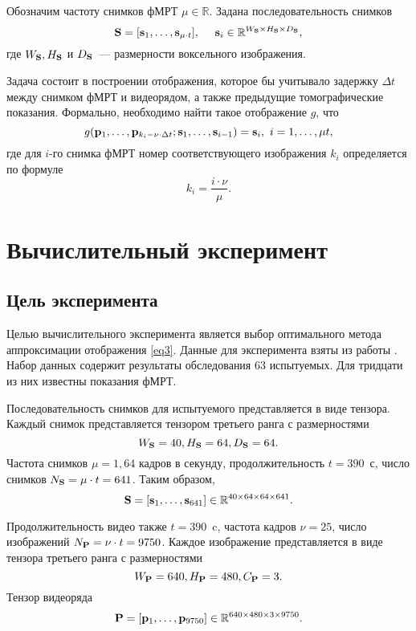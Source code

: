 \documentclass[a4paper, 12pt]{article}
\begin{document}
	Обозначим частоту снимков фМРТ $\mu \in \mathbb{R}$. Задана последовательность снимков 
	\begin{equation}
		\label{eq2}
		\mathbf{S} = [\mathbf{s}_1, \ldots, \mathbf{s}_{\mu \cdot t}], \quad\
		\mathbf{s}_i \in \mathbb{R}^{W_{\mathbf{S}} \times H_{\mathbf{S}} \times D_{\mathbf{S}}},
	\end{equation}
	где $W_{\mathbf{S}}, H_{\mathbf{S}}$ и $D_{\mathbf{S}}$~--- размерности воксельного изображения. 

	Задача состоит в построении отображения, которое бы учитывало задержку $\Delta t$ между
	снимком фМРТ и видеорядом, а также предыдущие томографические показания. Формально, необходимо
	найти такое отображение $g$, что
	\begin{equation}
		\label{eq3}
		g(\mathbf{p}_1, \ldots, \mathbf{p}_{k_i - \nu \cdot \Delta t}; \mathbf{s}_1, \ldots, \mathbf{s}_{i-1}) = \mathbf{s}_i,
		\ i = 1, \ldots, \mu t,
	\end{equation}
	где для $i$-го снимка фМРТ номер соответствующего изображения $k_i$ определяется по формуле
	\begin{equation}
		\label{eq4}
		k_i = \dfrac{i \cdot \nu}{\mu}.
	\end{equation}

\section{Вычислительный эксперимент}

\subsection{Цель эксперимента}

	Целью вычислительного эксперимента является выбор оптимального метода аппроксимации
	отображения \eqref{eq3}. Данные для эксперимента взяты из работы \citep{Berezutskaya2022}. 
	Набор данных содержит результаты обследования 63 испытуемых. Для тридцати из них известны
	показания фМРТ.

	Последовательность снимков для испытуемого представляется в виде тензора.
	Каждый снимок представляется тензором третьего ранга с размерностями 
	\[ W_{\mathbf{S}} = 40, H_{\mathbf{S}} = 64, D_{\mathbf{S}} = 64. \]
	Частота снимков $\mu = 1,64$ кадров в секунду, продолжительность $t = 390$~с, 
	число снимков $N_{\mathbf{S}} = \mu \cdot t = 641$. Таким образом, 
	\[ \mathbf{S} = [\mathbf{s}_1, \ldots, \mathbf{s}_{641}] \in \mathbb{R}^{40 \times 64 \times 64 \times 641}. \]

	Продолжительность видео также $t = 390$~c, частота кадров $\nu = 25$, число изображений
	$N_{\mathbf{P}} = \nu \cdot t = 9750$.
	Каждое изображение представляется в виде тензора третьего ранга с размерностями
	\[ W_{\mathbf{P}} = 640, H_{\mathbf{P}} = 480, C_{\mathbf{P}} = 3. \]
	Тензор видеоряда
	\[ \mathbf{P} = [\mathbf{p}_1, \ldots, \mathbf{p}_{9750}] \in \mathbb{R}^{640 \times 480 \times 3 \times 9750}. \]
\end{document}

